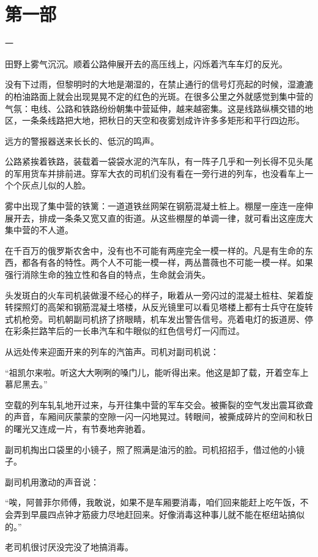

\section{ 第一部}


一

田野上雾气沉沉。顺着公路伸展开去的高压线上，闪烁着汽车车灯的反光。

没有下过雨，但黎明时的大地是潮湿的，在禁止通行的信号灯亮起的时候，湿漉漉的柏油路面上就会出现晃晃不定的红色的光斑。在很多公里之外就感觉到集中营的气氛：电线、公路和铁路纷纷朝集中营延伸，越来越密集。这是线路纵横交错的地区，一条条线路把大地，把秋日的天空和夜雾划成许许多多矩形和平行四边形。

远方的警报器送来长长的、低沉的鸣声。

公路紧挨着铁路，装载着一袋袋水泥的汽车队，有一阵子几乎和一列长得不见头尾的军用货车并排前进。穿军大衣的司机们没有看在一旁行进的列车，也没看车上一个个灰点儿似的人脸。

雾中出现了集中营的铁篱：一道道铁丝网架在钢筋混凝土桩上。棚屋一座连一座伸展开去，排成一条条又宽又直的街道。从这些棚屋的单调一律，就可看出这座庞大集中营的不人道。

在千百万的俄罗斯农舍中，没有也不可能有两座完全一模一样的。凡是有生命的东西，都各有各的特性。两个人不可能一模一样，两丛蔷薇也不可能一模一样。如果强行消除生命的独立性和各自的特点，生命就会消失。

头发斑白的火车司机装做漫不经心的样子，瞅着从一旁闪过的混凝土桩柱、架着旋转探照灯的高架和钢筋混凝土塔楼，从反光镜里可以看见塔楼上都有士兵守在旋转式机枪旁。司机朝副司机挤了挤眼睛，机车发出警告信号。亮着电灯的扳道房、停在彩条拦路竿后的一长串汽车和牛眼似的红色信号灯一闪而过。

从远处传来迎面开来的列车的汽笛声。司机对副司机说：

“祖凯尔来啦。听这大大咧咧的嗓门儿，能听得出来。他这是卸了载，开着空车上慕尼黑去。”

空载的列车轧轧地开过来，与开往集中营的军车交会。被撕裂的空气发出震耳欲聋的声音，车厢间灰蒙蒙的空隙一闪一闪地晃过。转眼间，被撕成碎片的空间和秋日的曙光又连成一片，有节奏地奔驰着。

副司机掏出口袋里的小镜子，照了照满是油污的脸。司机招招手，借过他的小镜子。

副司机用激动的声音说：

“唉，阿普菲尔师傅，我敢说，如果不是车厢要消毒，咱们回来能赶上吃午饭，不会弄到早晨四点钟才筋疲力尽地赶回来。好像消毒这种事儿就不能在枢纽站搞似的。”

老司机很讨厌没完没了地搞消毒。

